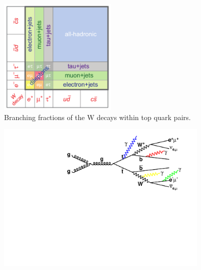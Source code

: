 \begin{figure}
\begin{center}
\includegraphics[width=0.5\textwidth]{Figures/ttbarDecayFractions.png}
\caption{Branching fractions of the W decays within top quark pairs. \cite{ttbarDecayFractions}}
\end{center}
\end{figure}

\begin{figure} \label{fig-ttgammaFeynmanDiagram}
\begin{center}
\includegraphics[width=0.9\textwidth]{Figures/ttgammaFeynmanDiagram.pdf}
\caption{}
\end{center}
\end{figure}